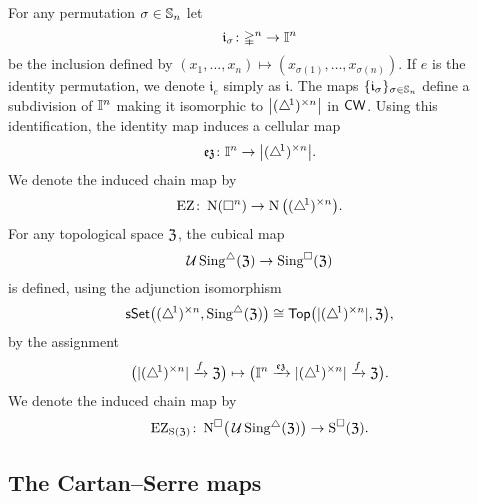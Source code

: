 For any permutation $\sigma \in \sym_n$ let
\[
\gi_\sigma \colon \gsimplex^n \to \gcube^n
\]
be the inclusion defined by $(x_1, \dots, x_n) \mapsto (x_{\sigma(1)}, \dots, x_{\sigma(n)})$.
If $e$ is the identity permutation, we denote $\mathfrak{i}_{e}$ simply as $\mathfrak{i}$.
The maps $\set{\mathfrak{i}_\sigma}_{\sigma \in \sym_n}$ define a subdivision of $\gcube^n$ making it isomorphic to $\bars[\big]{\scube{n}}$ in $\CW$.
Using this identification, the identity map induces a cellular map
\[
\ez \colon \gcube^n \to \bars[\big]{\scube{n}}.
\]
We denote the induced chain map by
\[
\EZ \colon \chains(\cube^n) \to \chains\big(\scube{n}\big).
\]
For any topological space $\fZ$, the cubical map
\[
\cubify\sSing(\fZ) \to \cSing(\fZ)
\]
is defined, using the adjunction isomorphism
\[
\sSet\big(\scube{n}, \sSing(\fZ)\big) \cong
\Top\big(\bars{\scube{n}}, \fZ\big),
\]
by the assignment
\[
\big( \bars{\scube{n}} \xra{f} \fZ \big) \mapsto
\big( \gcube^n \xra{\ez} \bars{\scube{n}} \xra{f} \fZ \big).
\]
We denote the induced chain map by
\[
\EZ_{\Schains(\fZ)} \colon
\cchains\!\big(\cubify\sSing(\fZ)\big) \to \cSchains(\fZ).
\]



\subsection{The Cartan--Serre maps}

